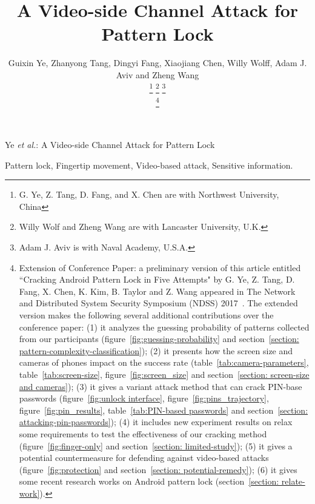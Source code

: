 \documentclass[journal,table]{IEEEtran}
\begin{document}
\title{A Video-side Channel Attack for Pattern Lock}
\author{Guixin Ye, Zhanyong Tang, Dingyi Fang, Xiaojiang Chen,
        Willy Wolff, Adam J. Aviv and Zheng Wang

    \thanks{G. Ye, Z. Tang, D. Fang, and X. Chen are with Northwest University, China}%
    \thanks{Willy Wolf and Zheng Wang are with Lancaster University, U.K.}
    \thanks{Adam J. Aviv is with Naval Academy, U.S.A.}

    \thanks{
            Extension of Conference Paper: a preliminary version of this article entitled ``Cracking Android Pattern Lock
            in Five Attempts" by G. Ye, Z. Tang, D. Fang, X. Chen, K. Kim, B. Taylor and Z. Wang appeared in
            The Network and Distributed System Security Symposium (NDSS) 2017~\cite{ye2017cracking}.
            The extended version makes the following several additional contributions over the conference
            paper: (1) it analyzes the guessing probability of patterns collected from our participants (figure~\ref{fig:guessing-probability} and section~\ref{section: pattern-complexity-classification});
            (2) it presents how the screen size and cameras of phones impact on the success rate (table~\ref{tab:camera-parameters}, table~\ref{tab:screen-size}, figure~\ref{fig:screen_size} and section~\ref{section: screen-size and cameras});
            (3) it gives a variant attack method that can crack PIN-base passwords (figure~\ref{fig:unlock interface}, figure~\ref{fig:pins_trajectory}, figure~\ref{fig:pin_results}, table~\ref{tab:PIN-based passwords} and section~\ref{section: attacking-pin-passwords});
            (4) it includes new experiment results on relax some requirements to test the effectiveness of our cracking method (figure~\ref{fig:finger-only} and section~\ref{section: limited-study});
            (5) it gives a potential countermeasure for defending against video-based attacks (figure~\ref{fig:protection} and section~\ref{section: potential-remedy});
            (6) it gives some recent research works on Android pattern lock (section~\ref{section: relate-work}).
    }
}


%
{Ye \MakeLowercase{\textit{et al.}}: A Video-side Channel Attack for Pattern Lock}

\maketitle



\begin{IEEEkeywords}
    Pattern lock, Fingertip movement, Video-based attack, Sensitive information.
\end{IEEEkeywords}












\IEEEpeerreviewmaketitle


\ifCLASSOPTIONcaptionsoff
  \newpage
\fi


\balance

\end{document}
